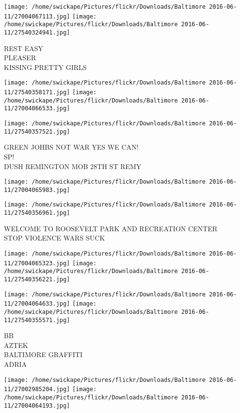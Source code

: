 \documentclass[10pt,letterpaper]{article}
\begin{document}
\vspace{0.25in}
\texttt{[image: /home/swickape/Pictures/flickr/Downloads/Baltimore 2016-06-11/27004067113.jpg]}
\texttt{[image: /home/swickape/Pictures/flickr/Downloads/Baltimore 2016-06-11/27540324941.jpg]}

REST EASY\\
PLEASER\\
KISSING PRETTY GIRLS
\pagebreak

\texttt{[image: /home/swickape/Pictures/flickr/Downloads/Baltimore 2016-06-11/27540358171.jpg]}
\texttt{[image: /home/swickape/Pictures/flickr/Downloads/Baltimore 2016-06-11/27004066533.jpg]}

\texttt{[image: /home/swickape/Pictures/flickr/Downloads/Baltimore 2016-06-11/27540357521.jpg]}

GREEN JOHBS NOT WAR YES WE CAN!\\
SP!\\
DUSH REMINGTON MOB 28TH ST REMY
\pagebreak

\texttt{[image: /home/swickape/Pictures/flickr/Downloads/Baltimore 2016-06-11/27004065983.jpg]}

\vspace{0.25in}
\texttt{[image: /home/swickape/Pictures/flickr/Downloads/Baltimore 2016-06-11/27540356961.jpg]}

WELCOME TO ROOSEVELT PARK AND RECREATION CENTER\\
STOP VIOLENCE WARS SUCK
\pagebreak

\texttt{[image: /home/swickape/Pictures/flickr/Downloads/Baltimore 2016-06-11/27004065323.jpg]}
\texttt{[image: /home/swickape/Pictures/flickr/Downloads/Baltimore 2016-06-11/27540356221.jpg]}

\texttt{[image: /home/swickape/Pictures/flickr/Downloads/Baltimore 2016-06-11/27004064633.jpg]}
\texttt{[image: /home/swickape/Pictures/flickr/Downloads/Baltimore 2016-06-11/27540355571.jpg]}

BB\\
AZTEK\\
BALTIMORE GRAFFITI\\
ADRIA
\pagebreak

\texttt{[image: /home/swickape/Pictures/flickr/Downloads/Baltimore 2016-06-11/27002985204.jpg]}
\texttt{[image: /home/swickape/Pictures/flickr/Downloads/Baltimore 2016-06-11/27004064193.jpg]}
\end{document}
